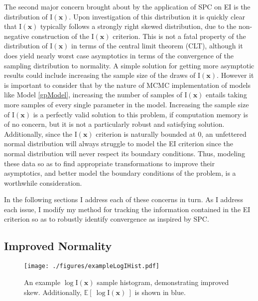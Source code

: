 \documentclass[12pt]{article}
\newcommand{\E}[1]{
        \mathbb{E}\left[~#1~\right]
}
\def \ix {
	\text{I}(\bm{x})
}
\begin{document}
	The second major concern brought about by the application of SPC on EI is the distribution of $\ix$.
	Upon investigation of this distribution it is quickly clear that $\ix$ typically follows a strongly right skewed distribution, due to the non-negative construction of the $\ix$ criterion.
	This is not a fatal property of the distribution of $\ix$ in terms of the central limit theorem (CLT), although it does yield nearly worst case asymptotics in terms of the convergence of the sampling distribution to normality.
	A simple solution for getting more asymptotic results could include increasing the sample size of the draws of $\ix$.
	However it is important to consider that by the nature of MCMC implementation of models like Model \ref{gpModel}, increasing the number of samples of $\ix$ entails taking more samples of every single parameter in the model.
	Increasing the sample size of $\ix$ is a perfectly valid solution to this problem, if computation memory is of no concern, but it is not a particularly robust and satisfying solution.
	Additionally, since the $\ix$ criterion is naturally bounded at 0, an unfettered normal distribution will always struggle to model the EI criterion since the normal distribution will never respect its boundary conditions.
	Thus, modeling these data so as to find appropriate transformations to improve their asymptotics, and better model the boundary conditions of the problem, is a worthwhile consideration. 
	
	
	In the following sections I address each of these concerns in turn. 
	As I address each issue, I modify my method for tracking the information contained in the EI criterion so as to robustly identify convergence as inspired by SPC.

	\clearpage
	\subsection{Improved Normality}
	
	\begin{wrapfigure}{l}{0.5\textwidth}
	\vspace{-1.1cm}
	\begin{center}
	\texttt{[image: ./figures/exampleLogIHist.pdf]}
	\end{center}
	\vspace{-0.85cm}
	\caption{An example $\log\ix$ sample histogram, demonstrating improved skew. Additionally, $\E{\log\ix}$ is shown in blue.}
	\label{logIxEX}
	\end{wrapfigure}
	
\end{document}
